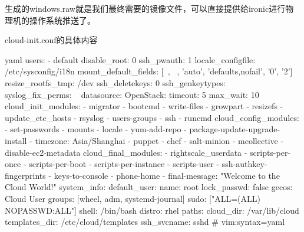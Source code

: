 生成的windows.raw就是我们最终需要的镜像文件，可以直接提供给ironic进行物理机的操作系统推送了。

cloud-init.conf的具体内容
\begin{code-block}{yaml}
users:
 - default
disable_root: 0
ssh_pwauth:   1
locale_configfile: /etc/sysconfig/i18n
mount_default_fields: [~, ~, 'auto', 'defaults,nofail', '0', '2']
resize_rootfs_tmp: /dev
ssh_deletekeys:   0
ssh_genkeytypes:  ~
syslog_fix_perms: ~
datasource:
  OpenStack:
    timeout: 5
    max_wait: 10
cloud_init_modules:
 - migrator
 - bootcmd
 - write-files
 - growpart
 - resizefs
 - update_etc_hosts
 - rsyslog
 - users-groups
 - ssh
 - runcmd
cloud_config_modules:
 - set-passwords
 - mounts
 - locale
 - yum-add-repo
 - package-update-upgrade-install
 - timezone: Asia/Shanghai
 - puppet
 - chef
 - salt-minion
 - mcollective
 - disable-ec2-metadata
cloud_final_modules:
 - rightscale_userdata
 - scripts-per-once
 - scripts-per-boot
 - scripts-per-instance
 - scripts-user
 - ssh-authkey-fingerprints
 - keys-to-console
 - phone-home
 - final-message: "Welcome to the Cloud World!"
system_info:
  default_user:
    name: root
    lock_passwd: false
    gecos: Cloud User
    groups: [wheel, adm, systemd-journal]
    sudo: ["ALL=(ALL) NOPASSWD:ALL"]
    shell: /bin/bash
  distro: rhel
  paths:
    cloud_dir: /var/lib/cloud
    templates_dir: /etc/cloud/templates
  ssh_svcname: sshd
# vim:syntax=yaml
\end{code-block}
